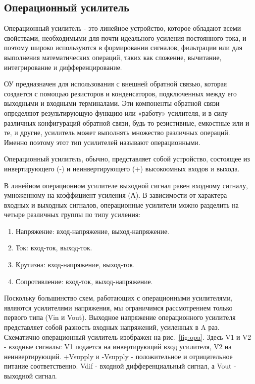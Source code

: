 \documentclass[a4paper,12pt,oneside]{scrartcl}
\begin{document}
\subsection{Операционный усилитель}

Операционный усилитель - это линейное устройство, которое обладают всеми свойствами, необходимыми для почти идеального усиления постоянного тока, и поэтому широко используются в формировании сигналов, фильтрации или для выполнения математических операций, таких как сложение, вычитание, интегрирование и дифференцирование.

ОУ предназначен для использования с внешней обратной связью, которая создается с помощью резисторов и конденсаторов, подключенных между его выходными и входными терминалами. Эти компоненты обратной связи определяют результирующую функцию или «работу» усилителя, и в силу различных конфигураций обратной связи, будь то резистивные, емкостные или и те, и другие, усилитель может выполнять множество различных операций. Именно поэтому этот тип усилителей называют операционными.

Операционный усилитель, обычно, представляет собой устройство, состоящее из инвертирующего (-) и неинвертирующего (+) высокоомных входов и выхода. 

В линейном операционном усилителе выходной сигнал равен входному сигналу, умноженному на коэффициент усиления (А). В зависимости от характера входных и выходных сигналов, операционные усилители можно разделить на четыре различных группы по типу усиления:
\begin{enumerate}
    \item Напряжение: вход-напряжение, выход-напряжение.
    \item Ток:  вход-ток, выход-ток.
    \item Крутизна: вход-напряжение, выход-ток.
    \item Сопротивление: вход-ток, выход-напряжение.
\end{enumerate}
	
Поскольку большинство схем, работающих с операционными усилителями, являются усилителями напряжения, мы ограничимся рассмотрением только первого типа (Vin и Vout).
Выходное напряжение операционного усилителя представляет собой разность входных напряжений, усиленных в A раз.
Схематично операционный усилитель изображен на рис.~\ref{fig:opa}. Здесь V1 и V2 - входные сигналы: V1 подается на инвертирующий вход усилителя, V2 на неинвертирующий. +Vsupply и -Vsupply - положительное и отрицательное питание соответственно. Vdif - входной дифференциальный сигнал, а Vout - выходной сигнал.~\cite{B4}
\end{document}
